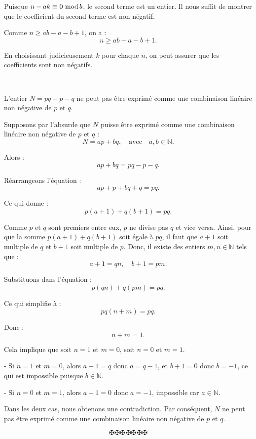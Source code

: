 Puisque $n - ak \equiv 0 \, \operatorname{mod} b$, le second terme est un entier. Il
nous suffit de montrer que le coefficient du second terme est non n{\'e}gatif.

Comme $n \geq ab - a - b + 1$, on a :
\[ n \geq ab - a - b + 1. \]


En choisissant judicieusement $k$ pour chaque $n$, on peut assurer que les
coefficients sont non n{\'e}gatifs.

\


L'entier $N = pq - p - q$ ne peut pas {\^e}tre exprim{\'e} comme une
combinaison lin{\'e}aire non n{\'e}gative de $p$ et $q$.


Supposons par l'absurde que $N$ puisse {\^e}tre exprim{\'e} comme une
combinaison lin{\'e}aire non n{\'e}gative de $p$ et $q$ :
\[ N = ap + bq, \quad \text{avec} \quad a, b \in \mathbb{N}. \]


Alors :
\[ ap + bq = pq - p - q. \]


R{\'e}arrangeons l'{\'e}quation :
\[ ap + p + bq + q = pq. \]


Ce qui donne :
\[ p (a + 1) + q (b + 1) = pq. \]


Comme $p$ et $q$ sont premiers entre eux, $p$ ne divise pas $q$ et vice versa.
Ainsi, pour que la somme $p (a + 1) + q (b + 1)$ soit {\'e}gale {\`a} $pq$, il
faut que $a + 1$ soit multiple de $q$ et $b + 1$ soit multiple de $p$. Donc,
il existe des entiers $m, n \in \mathbb{N}$ tels que :
\[ a + 1 = qn, \quad b + 1 = pm. \]


Substituons dans l'{\'e}quation :
\[ p (qn) + q (pm) = pq. \]


Ce qui simplifie {\`a} :
\[ pq (n + m) = pq. \]


Donc :
\[ n + m = 1. \]


Cela implique que soit $n = 1$ et $m = 0$, soit $n = 0$ et $m = 1$.

- Si $n = 1$ et $m = 0$, alors $a + 1 = q$ donc $a = q - 1$, et $b + 1 = 0$
donc $b = - 1$, ce qui est impossible puisque $b \in \mathbb{N}$.

- Si $n = 0$ et $m = 1$, alors $a + 1 = 0$ donc $a = - 1$, impossible car $a
\in \mathbb{N}$.

Dans les deux cas, nous obtenons une contradiction. Par cons{\'e}quent, $N$ ne
peut pas {\^e}tre exprim{\'e} comme une combinaison lin{\'e}aire non
n{\'e}gative de $p$ et $q$.


\[ \maltese \maltese \maltese \maltese \maltese \maltese \maltese \]
